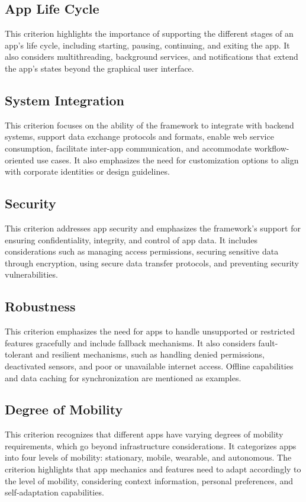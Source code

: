 \subsection{App Life Cycle}
This criterion highlights the importance of supporting the different stages of an app's life cycle, including starting, pausing, continuing, and exiting the app. It also considers multithreading, background services, and notifications that extend the app's states beyond the graphical user interface.

\subsection{System Integration}
This criterion focuses on the ability of the framework to integrate with backend systems, support data exchange protocols and formats, enable web service consumption, facilitate inter-app communication, and accommodate workflow-oriented use cases. It also emphasizes the need for customization options to align with corporate identities or design guidelines.

\subsection{Security}
This criterion addresses app security and emphasizes the framework's support for ensuring confidentiality, integrity, and control of app data. It includes considerations such as managing access permissions, securing sensitive data through encryption, using secure data transfer protocols, and preventing security vulnerabilities.

\subsection{Robustness}
This criterion emphasizes the need for apps to handle unsupported or restricted features gracefully and include fallback mechanisms. It also considers fault-tolerant and resilient mechanisms, such as handling denied permissions, deactivated sensors, and poor or unavailable internet access. Offline capabilities and data caching for synchronization are mentioned as examples.

\subsection{Degree of Mobility}
This criterion recognizes that different apps have varying degrees of mobility requirements, which go beyond infrastructure considerations. It categorizes apps into four levels of mobility: stationary, mobile, wearable, and autonomous. The criterion highlights that app mechanics and features need to adapt accordingly to the level of mobility, considering context information, personal preferences, and self-adaptation capabilities.

